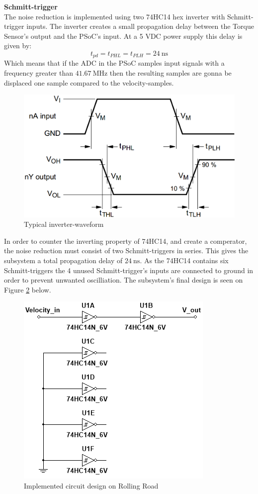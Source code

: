 \textbf{Schmitt-trigger}\\
The noise reduction is implemented using two 74HC14 hex inverter with Schmitt-trigger inputs\cite{74HC14}. The inverter creates a small propagation delay between the Torque Sensor's output and the PSoC's input. At a 5 VDC power supply this delay is given by:
\begin{equation}
	t_{pd} = t_{PHL} = t_{PLH} = \SI{24}{\nano \second}
\end{equation}
Which means that if the ADC in the PSoC samples input signals with a frequency greater than $\SI{41.67}{\mega \hertz}$ then the resulting samples are gonna be displaced one sample compared to the velocity-samples.

\begin{figure}[H]
	\centering
	\includegraphics[width=0.5\linewidth]{Hardware/Pictures/74HC14_waveform}
	\caption{Typical inverter-waveform}
	\label{fig:SchmittTrigger_waveform}
\end{figure}

In order to counter the inverting property of 74HC14, and create a comperator, the noise reduction  must consist of two Schmitt-triggers in series. This gives the subsystem a total propagation delay of $\SI{24}{\nano \second}$. As the 74HC14 contains six Schmitt-triggers the 4 unused Schmitt-trigger's inputs are connected to ground in order to prevent unwanted oscilliation. The subsystem's final design is seen on Figure \ref{fig:SignalConverterVelocity} below.

\begin{figure}[H]
	\centering
	\includegraphics[width=0.5\linewidth]{Hardware/SignalConverter/VelocityDesign}
	\caption{Implemented circuit design on Rolling Road}
	\label{fig:SignalConverterVelocity}
\end{figure}

